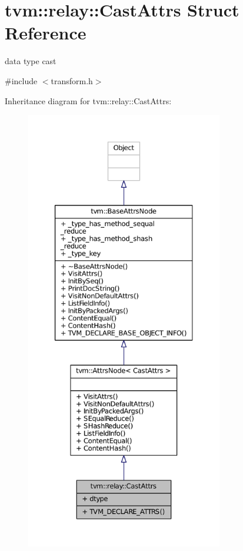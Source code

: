 \hypertarget{structtvm_1_1relay_1_1CastAttrs}{}\section{tvm\+:\+:relay\+:\+:Cast\+Attrs Struct Reference}
\label{structtvm_1_1relay_1_1CastAttrs}


data type cast  




{\ttfamily \#include $<$transform.\+h$>$}



Inheritance diagram for tvm\+:\+:relay\+:\+:Cast\+Attrs\+:
\nopagebreak
\begin{figure}[H]
\begin{center}
\leavevmode
\includegraphics[height=550pt]{structtvm_1_1relay_1_1CastAttrs__inherit__graph}
\end{center}
\end{figure}


